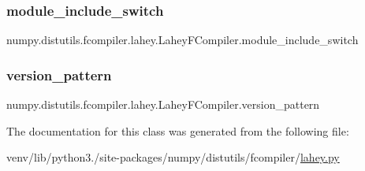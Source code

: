 \subsubsection{\texorpdfstring{module\+\_\+include\+\_\+switch}{module\_include\_switch}}
{\footnotesize\ttfamily numpy.\+distutils.\+fcompiler.\+lahey.\+Lahey\+F\+Compiler.\+module\+\_\+include\+\_\+switch\hspace{0.3cm}{\ttfamily [static]}}

\mbox{\label{classnumpy_1_1distutils_1_1fcompiler_1_1lahey_1_1LaheyFCompiler_a9f63d6a3ea269475737c2104a61a15fb}} 
\subsubsection{\texorpdfstring{version\+\_\+pattern}{version\_pattern}}
{\footnotesize\ttfamily numpy.\+distutils.\+fcompiler.\+lahey.\+Lahey\+F\+Compiler.\+version\+\_\+pattern\hspace{0.3cm}{\ttfamily [static]}}



The documentation for this class was generated from the following file\+:\begin{DoxyCompactItemize}
\item 
venv/lib/python3./site-\/packages/numpy/distutils/fcompiler/\hyperlink{lahey_8py}{lahey.\+py}\end{DoxyCompactItemize}
